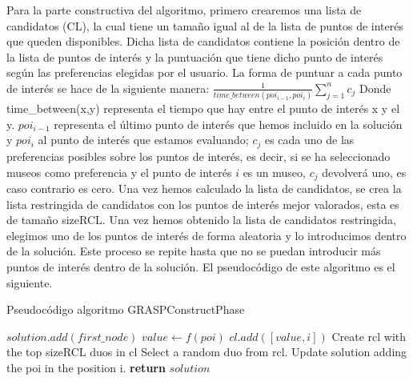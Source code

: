 \vspace{0.06in}
Para la parte constructiva del algoritmo, primero crearemos una lista de candidatos (CL), la cual tiene un tamaño igual al de la lista de puntos de interés que queden disponibles. Dicha lista de candidatos contiene la posición dentro de la lista de puntos de interés y la puntuación que tiene dicho punto de interés según las preferencias elegidas por el usuario. La forma de puntuar a cada punto de interés se hace de la siguiente manera:\newline
$ \frac{1}{time\_between(poi_{i-1},poi_i)}\sum_{j=1}^{n}c_j$ \newline
Donde time\_between(x,y) representa el tiempo que hay entre el punto de interés x y el y. $poi_{i-1}$ representa el último punto de interés que hemos incluido en la solución y $poi_i$ al punto de interés que estamos evaluando; $c_j$ es cada uno de las preferencias posibles sobre los puntos de interés, es decir, si se ha seleccionado museos como preferencia y el punto de interés $i$ es un museo, $c_j$ devolverá uno, es caso contrario es cero.\newline
Una vez hemos calculado la lista de candidatos, se crea la lista restringida de candidatos con los puntos de interés mejor valorados, esta es de tamaño sizeRCL. Una vez hemos obtenido la lista de candidatos restringida, elegimos uno de los puntos de interés de forma aleatoria y lo introducimos dentro de la solución. Este proceso se repite hasta que no se puedan introducir más puntos de interés dentro de la solución. El pseudocódigo de este algoritmo es el siguiente.
\vspace{0.06in}
\begin{algorithm}
	\caption{Pseudocódigo algoritmo GRASPConstructPhase}
	\label{alg:grasp_contruct}
	\begin{algorithmic}
		\State $solution.add(first\_node)$
				\State $value \gets f(poi)$
				\State $cl.add([value,i])$
			\EndFor
			\State Create rcl with the top sizeRCL duos in cl
			\State Select a random duo from rcl.
			\State Update solution adding the poi in the position i.
		\EndWhile
		\State \textbf{return} $solution$
		\EndFunction
	\end{algorithmic}
\end{algorithm}


